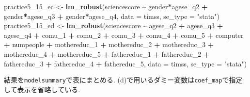 \documentclass[
]{book}
\newenvironment{Shaded}{\begin{snugshade}}{\end{snugshade}}
\newcommand{\AttributeTok}[1]{\textcolor[rgb]{0.13,0.29,0.53}{#1}}
\newcommand{\FunctionTok}[1]{\textcolor[rgb]{0.13,0.29,0.53}{\textbf{#1}}}
\newcommand{\NormalTok}[1]{#1}
\newcommand{\OtherTok}[1]{\textcolor[rgb]{0.56,0.35,0.01}{#1}}
\newcommand{\SpecialCharTok}[1]{\textcolor[rgb]{0.81,0.36,0.00}{\textbf{#1}}}
\newcommand{\StringTok}[1]{\textcolor[rgb]{0.31,0.60,0.02}{#1}}
\begin{document}
\begin{Shaded}
\begin{Highlighting}[]
\NormalTok{practice5\_15\_ec }\OtherTok{\textless{}{-}} \FunctionTok{lm\_robust}\NormalTok{(sciencescore }\SpecialCharTok{\textasciitilde{}}\NormalTok{ gender}\SpecialCharTok{*}\NormalTok{agese\_q2 }\SpecialCharTok{+}\NormalTok{ gender}\SpecialCharTok{*}\NormalTok{agese\_q3 }\SpecialCharTok{+}\NormalTok{ gender}\SpecialCharTok{*}\NormalTok{agese\_q4, }\AttributeTok{data =}\NormalTok{ timss, }\AttributeTok{se\_type =} \StringTok{"stata"}\NormalTok{)}
\NormalTok{practice5\_15\_ed }\OtherTok{\textless{}{-}} \FunctionTok{lm\_robust}\NormalTok{(sciencescore }\SpecialCharTok{\textasciitilde{}}\NormalTok{ agese\_q2 }\SpecialCharTok{+}\NormalTok{ agese\_q3 }\SpecialCharTok{+}\NormalTok{ agese\_q4 }\SpecialCharTok{+}\NormalTok{ comu\_1 }\SpecialCharTok{+}\NormalTok{ comu\_2 }\SpecialCharTok{+}\NormalTok{ comu\_3 }\SpecialCharTok{+}\NormalTok{ comu\_4 }\SpecialCharTok{+}\NormalTok{ comu\_5 }\SpecialCharTok{+}\NormalTok{ computer }\SpecialCharTok{+}\NormalTok{ numpeople }\SpecialCharTok{+}\NormalTok{ mothereduc\_1 }\SpecialCharTok{+}\NormalTok{ mothereduc\_2 }\SpecialCharTok{+}\NormalTok{ mothereduc\_3 }\SpecialCharTok{+}\NormalTok{ mothereduc\_4 }\SpecialCharTok{+}\NormalTok{ mothereduc\_5 }\SpecialCharTok{+}\NormalTok{ fathereduc\_1 }\SpecialCharTok{+}\NormalTok{ fathereduc\_2 }\SpecialCharTok{+}\NormalTok{ fathereduc\_3 }\SpecialCharTok{+}\NormalTok{ fathereduc\_4 }\SpecialCharTok{+}\NormalTok{ fathereduc\_5, }\AttributeTok{data =}\NormalTok{ timss, }\AttributeTok{se\_type =} \StringTok{"stata"}\NormalTok{)}
\end{Highlighting}
\end{Shaded}

結果を\texttt{modelsummary}で表にまとめる. (d)で用いるダミー変数は\texttt{coef\_map}で指定して表示を省略している.
\end{document}
